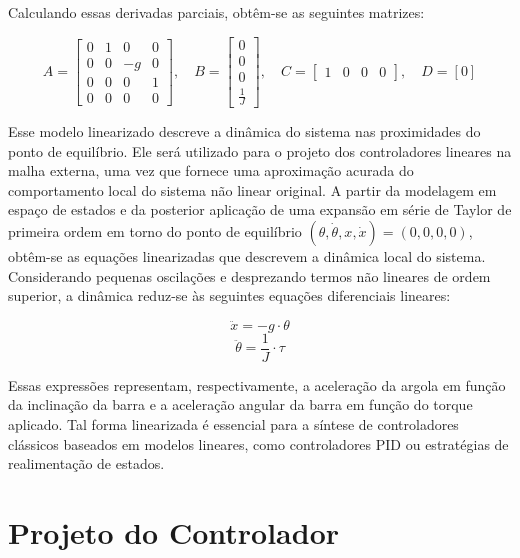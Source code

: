 \documentclass[a4paper, 12pt]{article}
\begin{document}
Calculando essas derivadas parciais, obtêm-se as seguintes matrizes:

\[
A = \begin{bmatrix}
0 & 1 & 0 & 0 \\
0 & 0 & -g & 0 \\
0 & 0 & 0 & 1 \\
0 & 0 & 0 & 0
\end{bmatrix}, \quad
B = \begin{bmatrix}
0 \\
0 \\
0 \\
\frac{1}{J}
\end{bmatrix}, \quad
C = \begin{bmatrix}
1 & 0 & 0 & 0
\end{bmatrix}, \quad
D = [0]
\]

Esse modelo linearizado descreve a dinâmica do sistema nas proximidades do ponto de equilíbrio. Ele será utilizado para o projeto dos controladores lineares na malha externa, uma vez que fornece uma aproximação acurada do comportamento local do sistema não linear original. A partir da modelagem em espaço de estados e da posterior aplicação de uma expansão em série de Taylor de primeira ordem em torno do ponto de equilíbrio \((\theta, \dot{\theta}, x, \dot{x}) = (0, 0, 0, 0)\), obtêm-se as equações linearizadas que descrevem a dinâmica local do sistema. Considerando pequenas oscilações e desprezando termos não lineares de ordem superior, a dinâmica reduz-se às seguintes equações diferenciais lineares:

\begin{equation}
    \ddot{x} = -g \cdot \theta
\end{equation}
\begin{equation}
    \ddot{\theta} = \frac{1}{J} \cdot \tau
\end{equation}

Essas expressões representam, respectivamente, a aceleração da argola em função da inclinação da barra e a aceleração angular da barra em função do torque aplicado. Tal forma linearizada é essencial para a síntese de controladores clássicos baseados em modelos lineares, como controladores PID ou estratégias de realimentação de estados.



\section{Projeto do Controlador}
\end{document}
